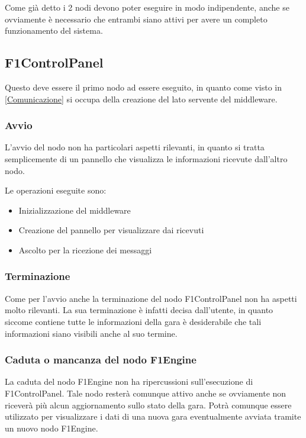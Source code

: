 \documentclass[a4paper,11pt, twoside, openright]{book}
\begin{document}
      Come già detto i 2 nodi devono poter eseguire in modo indipendente, anche se ovviamente
      è necessario che entrambi siano attivi per avere un completo funzionamento del sistema.
      
      \subsection{F1ControlPanel}
        Questo deve essere il primo nodo ad essere eseguito, in quanto come visto in \ref{Comunicazione} si occupa
	della creazione del lato servente del middleware.
	
	\subsubsection{Avvio}
	  L'avvio del nodo non ha particolari aspetti rilevanti, in quanto si tratta semplicemente di un
	  pannello che visualizza le informazioni ricevute dall'altro nodo.
	  
	  Le operazioni eseguite sono:
	  
	  \begin{itemize}
	    \item Inizializzazione del middleware
	    \item Creazione del pannello per visualizzare  dai ricevuti
	    \item Ascolto per la ricezione dei messaggi
	  \end{itemize}
	  
	\subsubsection{Terminazione}
	  Come per l'avvio anche la terminazione del nodo F1ControlPanel non ha aspetti molto rilevanti. 
	  La sua terminazione è infatti decisa dall'utente, in quanto siccome contiene tutte le informazioni
	  della gara è desiderabile che tali informazioni siano visibili anche al suo termine.
	  
	\subsubsection{Caduta o mancanza del nodo F1Engine}
	  La caduta del nodo F1Engine non ha ripercussioni sull'esecuzione di F1ControlPanel. Tale nodo
	  resterà comunque attivo anche se ovviamente non riceverà più alcun aggiornamento sullo stato della gara.
	  Potrà comunque essere utilizzato per visualizzare i dati di una nuova gara eventualmente avviata tramite un nuovo nodo
	  F1Engine.
\end{document}
